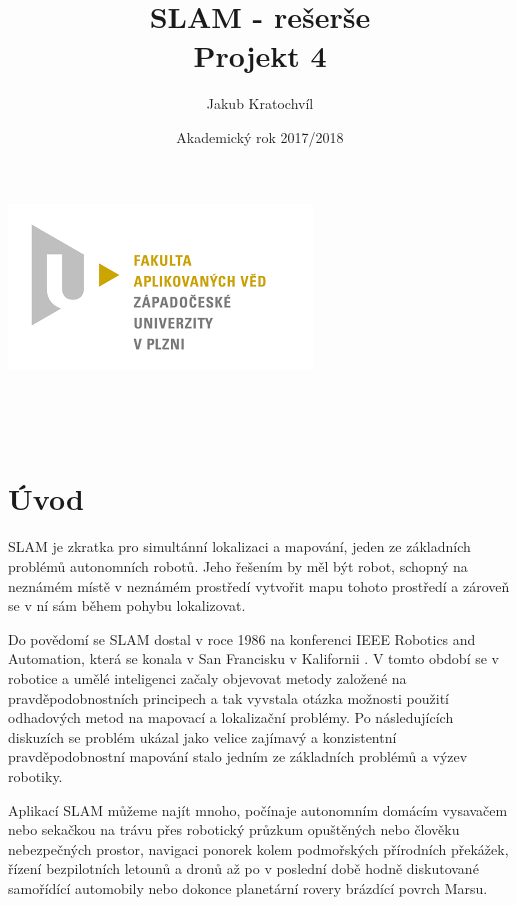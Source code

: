 \documentclass[12pt,a4paper]{article}
\begin{document}
\title{SLAM - rešerše \\ Projekt 4}
\author{Jakub Kratochvíl}
\date{Akademický rok 2017/2018}
\begin{titlepage}
\begin{center}
\includegraphics[scale=0.5]{img/logo_zcu.png}\\
\vspace{5cm}
\begin{Large}
\textbf{\thetitle}\\
\end{Large}
\vspace{3cm}
\theauthor\\
\vspace{5cm}
\thedate
\end{center}
\end{titlepage}
\newpage
		
		
\tableofcontents
\newpage
\fontsize{12pt}{18pt}\selectfont


\section{Úvod}
SLAM je zkratka pro simultánní lokalizaci a mapování, jeden ze základních problémů autonomních robotů. Jeho řešením by měl být robot, schopný na neznámém místě v neznámém prostředí vytvořit mapu tohoto prostředí a zároveň se v ní sám během pohybu lokalizovat.

Do povědomí se SLAM dostal v roce 1986 na konferenci IEEE Robotics and Automation, která se konala v San Francisku v Kalifornii \cite{Durrant-Whyte}. V tomto období se v robotice a umělé inteligenci začaly objevovat metody založené na pravděpodobnostních principech a tak vyvstala otázka možnosti použití odhadových metod na mapovací a lokalizační problémy. Po následujících diskuzích se problém ukázal jako velice zajímavý a konzistentní pravděpodobnostní mapování stalo jedním ze základních problémů a výzev robotiky.

Aplikací SLAM můžeme najít mnoho, počínaje autonomním domácím vysavačem nebo sekačkou na trávu přes robotický průzkum opuštěných nebo člověku nebezpečných prostor, navigaci ponorek kolem podmořských přírodních překážek, řízení bezpilotních letounů a dronů až po v poslední době hodně diskutované samořídící automobily nebo dokonce planetární rovery brázdící povrch Marsu.
\end{document}

